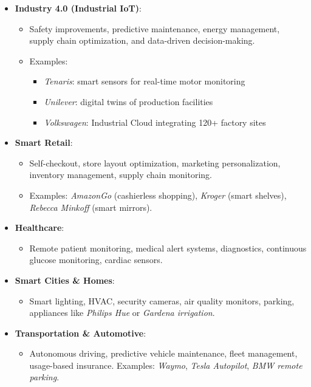 \documentclass[a4paper, 12pt]{book} %
\begin{document}
\begin{itemize}
\item
  \textbf{Industry 4.0 (Industrial IoT)}:

  \begin{itemize}
  \item
    Safety improvements, predictive maintenance, energy management,
    supply chain optimization, and data-driven decision-making.
  \item
    Examples:

    \begin{itemize}
    \item
      \emph{Tenaris}: smart sensors for real-time motor monitoring
    \item
      \emph{Unilever}: digital twins of production facilities
    \item
      \emph{Volkswagen}: Industrial Cloud integrating 120+ factory sites
    \end{itemize}
  \end{itemize}
\item
  \textbf{Smart Retail}:

  \begin{itemize}
  \item
    Self-checkout, store layout optimization, marketing personalization,
    inventory management, supply chain monitoring.
  \item
    Examples: \emph{AmazonGo} (cashierless shopping), \emph{Kroger}
    (smart shelves), \emph{Rebecca Minkoff} (smart mirrors).
  \end{itemize}
\item
  \textbf{Healthcare}:

  \begin{itemize}
  \tightlist
  \item
    Remote patient monitoring, medical alert systems, diagnostics,
    continuous glucose monitoring, cardiac sensors.
  \end{itemize}
\item
  \textbf{Smart Cities \& Homes}:

  \begin{itemize}
  \tightlist
  \item
    Smart lighting, HVAC, security cameras, air quality monitors,
    parking, appliances like \emph{Philips Hue} or \emph{Gardena
    irrigation}.
  \end{itemize}
\item
  \textbf{Transportation \& Automotive}:

  \begin{itemize}
  \tightlist
  \item
    Autonomous driving, predictive vehicle maintenance, fleet
    management, usage-based insurance. Examples: \emph{Waymo},
    \emph{Tesla Autopilot}, \emph{BMW remote parking}.
  \end{itemize}
\end{itemize}
\end{document}
